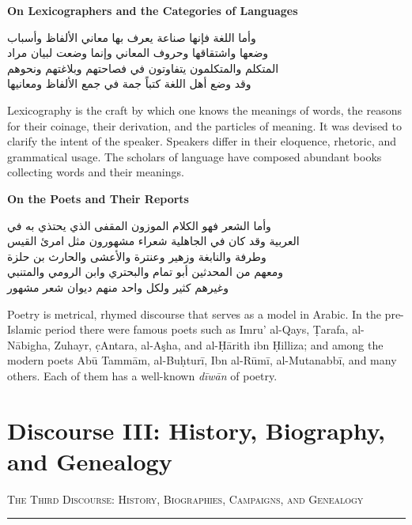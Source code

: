 \documentclass[11pt,a4paper]{article}
\newcommand{\ar}[1]{{\arabicfont\beginR #1\endR}}
\newcommand{\bilingual}[2]{%
  \noindent
  \begin{minipage}[t]{0.47\textwidth}
    \vspace{0pt}
    \begin{flushright}
    {\arabicfont\beginR #1\endR}
    \end{flushright}
  \end{minipage}%
  \hfill\vline\hfill
  \begin{minipage}[t]{0.47\textwidth}
    \vspace{0pt}
    #2
  \end{minipage}%
  \par\vspace{0.8em}
}
\newcommand{\bilingualsection}[2]{%
  \vspace{1em}%
  \noindent
  \begin{minipage}[t]{0.47\textwidth}
    \begin{flushright}
    \textsc{\color{sectioncolor}\ar{#1}}
    \end{flushright}
  \end{minipage}%
  \hfill
  \begin{minipage}[t]{0.47\textwidth}
    \textsc{\color{sectioncolor}#2}
  \end{minipage}%
  \par\vspace{0.5em}\hrule\vspace{0.8em}%
}
\newcommand{\bilingualsubsection}[2]{%
  \vspace{0.6em}%
  \noindent
  \begin{minipage}[t]{0.47\textwidth}
    \begin{flushright}
    \textbf{\color{sectioncolor}\ar{#1}}
    \end{flushright}
  \end{minipage}%
  \hfill
  \begin{minipage}[t]{0.47\textwidth}
    \textbf{\color{sectioncolor}#2}
  \end{minipage}%
  \par\vspace{0.4em}%
}
\begin{document}
\bilingualsubsection{في اللغويين وأصناف اللغات}{On Lexicographers and the Categories of Languages}

\bilingual
{وأما اللغة فإنها صناعة يعرف بها معاني الألفاظ وأسباب\\
وضعها واشتقاقها وحروف المعاني وإنما وضعت لبيان مراد\\
المتكلم والمتكلمون يتفاوتون في فصاحتهم وبلاغتهم ونحوهم\\
وقد وضع أهل اللغة كتباً جمة في جمع الألفاظ ومعانيها}
{Lexicography is the craft by which one knows the meanings of words,
the reasons for their coinage, their derivation, and the particles of
meaning. It was devised to clarify the intent of the speaker. Speakers
differ in their eloquence, rhetoric, and grammatical usage. The scholars
of language have composed abundant books collecting words and their meanings.}

\vspace{0.5em}
\bilingualsubsection{في الشعراء وأخبارهم}{On the Poets and Their Reports}

\bilingual
{وأما الشعر فهو الكلام الموزون المقفى الذي يحتذي به في\\
العربية وقد كان في الجاهلية شعراء مشهورون مثل امرئ القيس\\
وطرفة والنابغة وزهير وعنترة والأعشى والحارث بن حلزة\\
ومعهم من المحدثين أبو تمام والبحتري وابن الرومي والمتنبي\\
وغيرهم كثير ولكل واحد منهم ديوان شعر مشهور}
{Poetry is metrical, rhymed discourse that serves as a model in Arabic.
In the pre-Islamic period there were famous poets such as Imru' al-Qays,
\d{T}arafa, al-N\=abigha, Zuhayr, \d{c}Antara, al-A\c{sha}, and al-\d{H}\=arith
ibn \d{H}illiza; and among the modern poets Ab\=u Tamm\=am,
al-Bu\d{h}tur\=i, Ibn al-R\=um\=i, al-Mutanabb\=i, and many others.
Each of them has a well-known \textit{d\=iw\=an} of poetry.}

\newpage

\section{Discourse III: History, Biography, and Genealogy}
\label{sec:III}

\bilingualsection{الفن الثالث في التاريخ والسير والمغازي والأنساب}{The Third Discourse: History, Biographies, Campaigns, and Genealogy}
\end{document}
